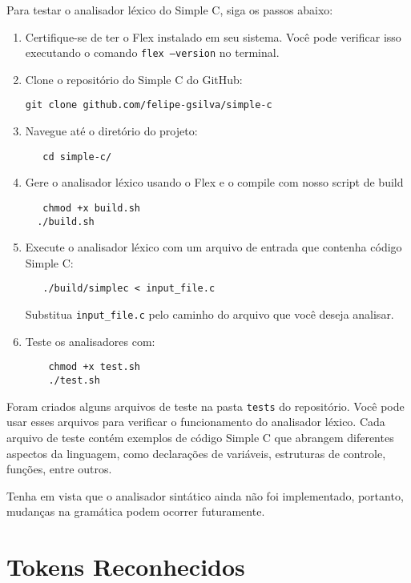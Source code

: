 \documentclass[12pt,a4paper]{article}
\begin{document}
Para testar o analisador léxico do Simple C, siga os passos abaixo:
\begin{enumerate}
  \item Certifique-se de ter o Flex instalado em seu sistema. Você pode verificar isso executando o comando \texttt{flex --version} no terminal.
  \item Clone o repositório do Simple C do GitHub:
 \begin{verbatim}
git clone github.com/felipe-gsilva/simple-c
 \end{verbatim}
  \item Navegue até o diretório do projeto:
 \begin{verbatim}
   cd simple-c/
 \end{verbatim}
  \item Gere o analisador léxico usando o Flex e o compile com nosso script de build
 \begin{verbatim}
   chmod +x build.sh
  ./build.sh
 \end{verbatim}
  \item Execute o analisador léxico com um arquivo de entrada que contenha código Simple C:
 \begin{verbatim}
   ./build/simplec < input_file.c
 \end{verbatim}
 Substitua \texttt{input\_file.c} pelo caminho do arquivo que você deseja analisar.

\item Teste os analisadores com:
  \begin{verbatim}
    chmod +x test.sh
    ./test.sh
  \end{verbatim}

\end{enumerate}


Foram criados alguns arquivos de teste na pasta \texttt{tests} do repositório. Você pode usar esses arquivos para verificar o funcionamento do analisador léxico. Cada arquivo de teste contém exemplos de código Simple C que abrangem diferentes aspectos da linguagem, como declarações de variáveis, estruturas de controle, funções, entre outros. 

Tenha em vista que o analisador sintático ainda não foi implementado, portanto, mudanças na gramática podem ocorrer futuramente.

\section{Tokens Reconhecidos}
\label{sec:token}
\end{document}
